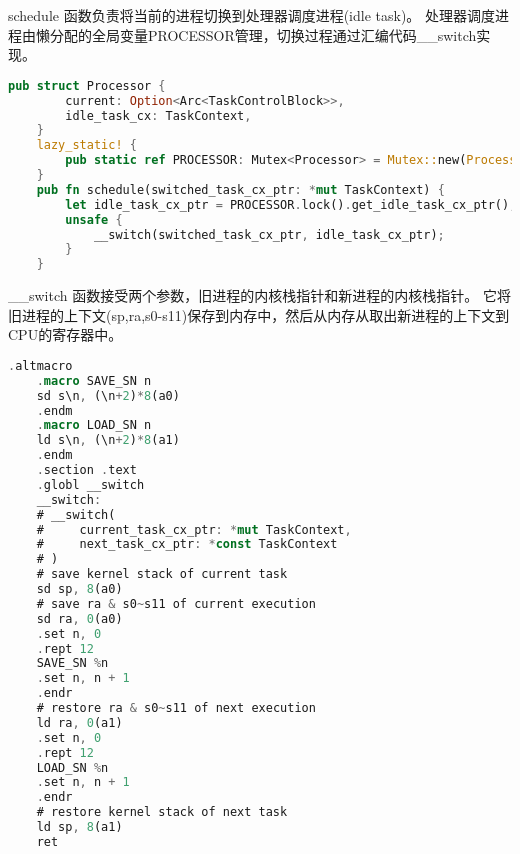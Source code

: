 schedule 函数负责将当前的进程切换到处理器调度进程(idle task)。
处理器调度进程由懒分配的全局变量PROCESSOR管理，切换过程通过汇编代码\_\_switch实现。
\begin{lstlisting}[language={Rust}, label={code:TaskContext}, caption={TaskContext}]
	pub struct Processor {
		current: Option<Arc<TaskControlBlock>>,
		idle_task_cx: TaskContext,
	}
	lazy_static! {
		pub static ref PROCESSOR: Mutex<Processor> = Mutex::new(Processor::new());
	}
	pub fn schedule(switched_task_cx_ptr: *mut TaskContext) {
		let idle_task_cx_ptr = PROCESSOR.lock().get_idle_task_cx_ptr();
		unsafe {
			__switch(switched_task_cx_ptr, idle_task_cx_ptr);
		}
	}
\end{lstlisting}

\_\_switch 函数接受两个参数，旧进程的内核栈指针和新进程的内核栈指针。
它将旧进程的上下文(sp,ra,s0-s11)保存到内存中，然后从内存从取出新进程的上下文到CPU的寄存器中。
\begin{lstlisting}[language={Rust}, label={code:switch}, caption={__switch}]
	.altmacro
	.macro SAVE_SN n
	sd s\n, (\n+2)*8(a0)
	.endm
	.macro LOAD_SN n
	ld s\n, (\n+2)*8(a1)
	.endm
	.section .text
	.globl __switch
	__switch:
	# __switch(
	#     current_task_cx_ptr: *mut TaskContext,
	#     next_task_cx_ptr: *const TaskContext
	# )
	# save kernel stack of current task
	sd sp, 8(a0)
	# save ra & s0~s11 of current execution
	sd ra, 0(a0)
	.set n, 0
	.rept 12
	SAVE_SN %n
	.set n, n + 1
	.endr
	# restore ra & s0~s11 of next execution
	ld ra, 0(a1)
	.set n, 0
	.rept 12
	LOAD_SN %n
	.set n, n + 1
	.endr
	# restore kernel stack of next task
	ld sp, 8(a1)
	ret
\end{lstlisting}